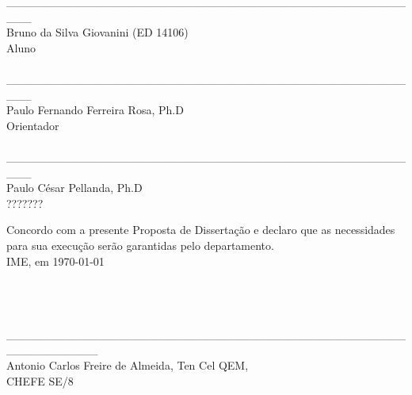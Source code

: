 \documentclass[a4paper, 12pt]{article}
\begin{document}
\newpage


 

\newpage

\begin{center}
\_\_\_\_\_\_\_\_\_\_\_\_\_\_\_\_\_\_\_\_\_\_\_\_\_\_\_\_\_\_\_\_\_\_\_\_\_\_\_\_\_\_\_\_\_\_\_\_\_\_\_ \\

Bruno da Silva Giovanini (ED 14106) \\Aluno \\ 
 
\hspace{4cm}
\\


\_\_\_\_\_\_\_\_\_\_\_\_\_\_\_\_\_\_\_\_\_\_\_\_\_\_\_\_\_\_\_\_\_\_\_\_\_\_\_\_\_\_\_\_\_\_\_\_\_\_\_ \\
Paulo Fernando Ferreira Rosa, Ph.D \\Orientador \\ 

\hspace{4cm}
\\


\_\_\_\_\_\_\_\_\_\_\_\_\_\_\_\_\_\_\_\_\_\_\_\_\_\_\_\_\_\_\_\_\_\_\_\_\_\_\_\_\_\_\_\_\_\_\_\_\_\_\_ \\
Paulo César Pellanda, Ph.D \\??????? \\

\hspace{4cm}

\end{center}
Concordo com a presente Proposta de Dissertação e declaro que as necessidades para sua execução serão garantidas pelo departamento. \\
IME, em \today
 \hspace{4cm}
 \\
 \\
 \\
 \\
 
\begin{center}
\_\_\_\_\_\_\_\_\_\_\_\_\_\_\_\_\_\_\_\_\_\_\_\_\_\_\_\_\_\_\_\_\_\_\_\_\_\_\_\_\_\_\_\_\_\_\_\_\_\_\_\_\_\_\_\_\_\_\_ \\
Antonio Carlos Freire de Almeida, Ten Cel QEM, \\
CHEFE SE/8
\end{center}
\end{document}
